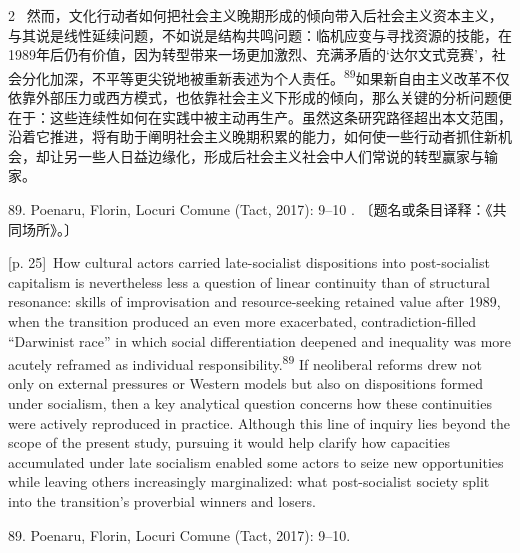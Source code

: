 \documentclass[10pt,a4paper]{article}
\begin{document}
\begin{paracol}{2}
\switchcolumn*
{\scriptsize\color{gray} [p. 25]}\ 然而，文化行动者如何把社会主义晚期形成的倾向带入后社会主义资本主义，与其说是线性延续问题，不如说是结构共鸣问题：临机应变与寻找资源的技能，在1989年后仍有价值，因为转型带来一场更加激烈、充满矛盾的‘达尔文式竞赛’，社会分化加深，不平等更尖锐地被重新表述为个人责\mbox{任。\textsuperscript{89}}如果新自由主义改革不仅依靠外部压力或西方模式，也依靠社会主义下形成的倾向，那么关键的分析问题便在于：这些连续性如何在实践中被主动再生产。虽然这条研究路径超出本文范围，沿着它推进，将有助于阐明社会主义晚期积累的能力，如何使一些行动者抓住新机会，却让另一些人日益边缘化，形成后社会主义社会中人们常说的转型赢家与输家。\par{\small 89. Poenaru, Florin, Locuri Comune (Tact, 2017): 9–10 . 〔题名或条目译释：《共同场所》。〕\par}
\switchcolumn
{\scriptsize\color{gray} [p. 25]}\ How cultural actors carried late-socialist dispositions into post-socialist capitalism is nevertheless less a question of linear continuity than of structural resonance: skills of improvisation and resource-seeking retained value after 1989, when the transition produced an even more exacerbated, contradiction-filled “Darwinist race” in which social differentiation deepened and inequality was more acutely reframed as individual responsibility.\nobreak\textsuperscript{89} If neoliberal reforms drew not only on external pressures or Western models but also on dispositions formed under socialism, then a key analytical question concerns how these continuities were actively reproduced in practice. Although this line of inquiry lies beyond the scope of the present study, pursuing it would help clarify how capacities accumulated under late socialism enabled some actors to seize new opportunities while leaving others increasingly marginalized: what post-socialist society split into the transition’s proverbial winners and losers.\par{\small 89. Poenaru, Florin, Locuri Comune (Tact, 2017): 9–10.\par}
\switchcolumn*

\end{paracol}
\end{document}
